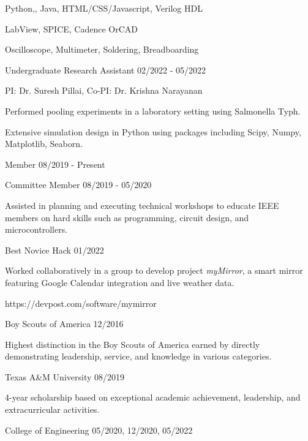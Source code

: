 \documentclass[11pt]{article}
\begin{document}

      {Python,\CPP, Java, HTML/CSS/Javascript, Verilog HDL}

      {LabView, SPICE, Cadence OrCAD}

      {Oscilloscope, Multimeter, Soldering, Breadboarding}


\begin{description}
\squish
{}
           {Undergraduate Research Assistant}
           {02/2022 - 05/2022} 

PI: Dr. Suresh Pillai, Co-PI: Dr. Krishna Narayanan

Performed pooling experiments in a laboratory setting using Salmonella Typh.

Extensive simulation design in Python using packages including Scipy, Numpy, Matplotlib, Seaborn.

           {Member}
           {08/2019 - Present}

           {Committee Member}
           {08/2019 - 05/2020}

Assisted in planning and executing technical workshops to educate IEEE members on hard skills
such as programming, circuit design, and microcontrollers.

           {Best Novice Hack}
           {01/2022}

Worked collaboratively in a group to develop project \emph{myMirror}, a smart mirror featuring
Google Calendar integration and live weather data.

https://devpost.com/software/mymirror

\end{description}


\begin{description}
\squish
{}
           {Boy Scouts of America}
           {12/2016}

Highest distinction in the Boy Scouts of America earned by directly demonstrating
leadership, service, and knowledge in various categories.

           {Texas A\&M University}
           {08/2019}

4-year scholarship based on exceptional academic achievement, leadership, and extracurricular activities.

           {College of Engineering}
           {05/2020, 12/2020, 05/2022}

\end{description}
\end{document}
